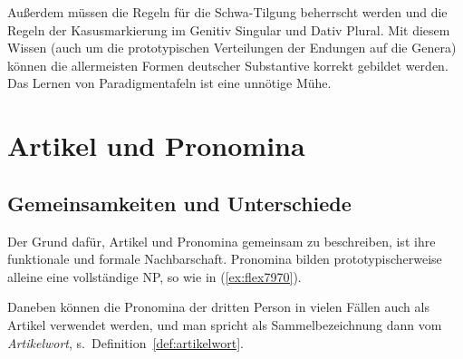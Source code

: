 Außerdem müssen die Regeln für die Schwa-Tilgung beherrscht werden und die Regeln der Kasusmarkierung im Genitiv Singular und Dativ Plural.
Mit diesem Wissen (auch um die prototypischen Verteilungen der Endungen auf die Genera) können die allermeisten Formen deutscher Substantive korrekt gebildet werden.
Das Lernen von Paradigmentafeln ist eine unnötige Mühe.




\section{Artikel und Pronomina}

\label{sec:artikelpronomen}

\subsection{Gemeinsamkeiten und Unterschiede}

Der Grund dafür, Artikel und Pronomina gemeinsam zu beschreiben, ist ihre funktionale und formale Nachbarschaft.
Pronomina bilden prototypischerweise alleine eine vollständige NP, so wie in (\ref{ex:flex7970}).

\begin{exe}
  \ex \label{ex:flex7970}
  \begin{xlist}
  \end{xlist}
\end{exe}

Daneben können die Pronomina der dritten Person in vielen Fällen auch als Artikel verwendet werden, und man spricht als Sammelbezeichnung dann vom \textit{Artikelwort}, s.\ Definition~\ref{def:artikelwort}.


